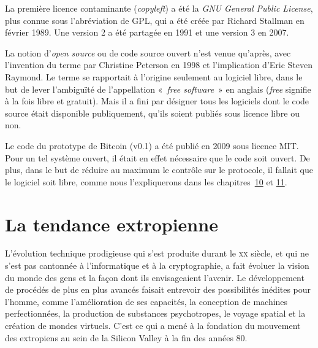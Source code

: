 \documentclass[
  a5paper,
  smalldemyvopaper,10pt,twoside,onecolumn,openright,extrafontsizes,hidelinks]{memoir}
\begin{document}
La première licence contaminante (\emph{copyleft}) a été la \emph{GNU
General Public License}, plus connue sous l'abréviation de GPL, qui a
été créée par Richard Stallman en février 1989. Une version 2 a été
partagée en 1991 et une version 3 en 2007.

La notion d'\emph{open source} ou de code source ouvert n'est venue
qu'après, avec l'invention du terme par Christine Peterson en 1998 et
l'implication d'Eric Steven Raymond. Le terme se rapportait à l'origine
seulement au logiciel libre, dans le but de lever l'ambiguïté de
l'appellation «~\emph{free software}~» en anglais (\emph{free} signifie
à la fois libre et gratuit). Mais il a fini par désigner tous les
logiciels dont le code source était disponible publiquement, qu'ils
soient publiés sous licence libre ou non.

Le code du prototype de Bitcoin (v0.1) a été publié en 2009 sous licence
MIT. Pour un tel système ouvert, il était en effet nécessaire que le
code soit ouvert. De plus, dans le but de réduire au maximum le contrôle
sur le protocole, il fallait que le logiciel soit libre, comme nous
l'expliquerons dans les chapitres~\hyperref[ch:changement]{10} et
\hyperref[ch:determination]{11}.

\section*{La tendance extropienne}\label{la-tendance-extropienne}


L'évolution technique prodigieuse qui s'est produite durant le
\textsc{xx} siècle, et qui ne s'est pas cantonnée à l'informatique et à
la cryptographie, a fait évoluer la vision du monde des gens et la façon
dont ils envisageaient l'avenir. Le développement de procédés de plus en
plus avancés faisait entrevoir des possibilités inédites pour l'homme,
comme l'amélioration de ses capacités, la conception de machines
perfectionnées, la production de substances psychotropes, le voyage
spatial et la création de mondes virtuels. C'est ce qui a mené à la
fondation du mouvement des extropiens au sein de la Silicon Valley à la
fin des années 80.
\end{document}
